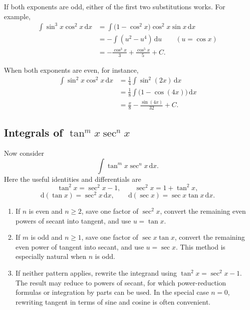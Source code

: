 If both exponents are odd, either of the first two substitutions works.  For
example,
\begin{align*}
    \int\sin^3x\cos^2x\,\mathrm{d}x
    &=\int\bigl(1-\cos^2x\bigr)\cos^2x\sin x\,\mathrm{d}x \\
    &=-\int(u^2-u^4)\,\mathrm{d}u
        \qquad (u=\cos x)\\
    &=-\frac{\cos^3x}{3}+\frac{\cos^5x}{5}+C.
\end{align*}

When both exponents are even, for instance,
\begin{align*}
    \int\sin^2x\cos^2x\,\mathrm{d}x
    &=\frac14\int\sin^2(2x)\,\mathrm{d}x \\
    &=\frac18\int\bigl(1-\cos(4x)\bigr)\,\mathrm{d}x \\
    &=\frac{x}{8}-\frac{\sin(4x)}{32}+C.
\end{align*}

\subsection{Integrals of \(\tan^m x\sec^n x\)}

Now consider
\[
    \int\tan^m x\sec^n x\,\mathrm{d}x.
\]
Here the useful identities and differentials are
\[
    \tan^2x=\sec^2x-1,
    \qquad
    \sec^2x=1+\tan^2x,
\]
\[
    \mathrm{d}(\tan x)=\sec^2x\,\mathrm{d}x,
    \qquad
    \mathrm{d}(\sec x)=\sec x\tan x\,\mathrm{d}x.
\]

\begin{enumerate}
    \item If \(n\) is even and \(n\geq2\), save one factor of
    \(\sec^2x\), convert the remaining even powers of secant into tangent,
    and use \(u=\tan x\).

    \item If \(m\) is odd and \(n\geq1\), save one factor of
    \(\sec x\tan x\), convert the remaining even power of tangent into
    secant, and use \(u=\sec x\).  This method is especially natural when
    \(n\) is odd.

    \item If neither pattern applies, rewrite the integrand using
    \(\tan^2x=\sec^2x-1\).  The result may reduce to powers of secant, for
    which power-reduction formulas or integration by parts can be used.  In
    the special case \(n=0\), rewriting tangent in terms of sine and cosine
    is often convenient.
\end{enumerate}

